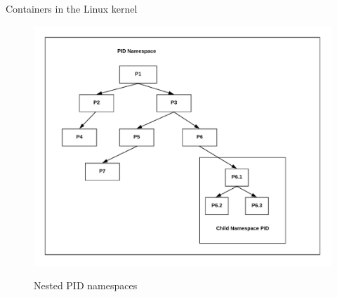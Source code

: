 \begin{frame}{Containers in the Linux kernel}
\begin{figure}
  \centering
  \includegraphics[scale=.15]{pidNamespace.png}
  \label{fig:pidnamespace}
  \caption{Nested PID namespaces}
\end{figure}
\end{frame}
